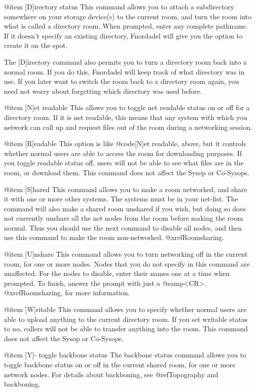 @item [D]irectory status
This command allows you to attach a subdirectory
somewhere on your storage device(s) to the current room, and
turn the room into what is called a directory room.  When
prompted, enter any complete pathname.  If it doesn't specify
an existing directory, Fnordadel will give you the option
to create it on the spot.

The [D]irectory command also permits you to turn a
directory room back into a normal room.  If you do this,
Fnordadel will keep track of what directory was in use.
If you later want to switch the room back to a directory room
again, you need not worry about forgetting which directory
was used before.

@item [N]et readable
This allows you to toggle net readable status
on or off for a directory room.  If it is net readable, this	
means that any system with which you network can call up and
request files out of the room during a networking session.

@item [R]eadable
This option is like @code{[N]et readable}, above,
but it controls whether normal users are able to access the
room for downloading purposes.  If you toggle readable status
off, users will not be able to see what files are in the room,
or download them.  This command does not affect the Sysop or Co-Sysops.

@item [S]hared
This command allows you to make a room networked, and
share it with one or more other systems.  The systems must be
in your net-list.  The command will also make a shared room
unshared if you wish, but doing so does not currently unshare
all the net nodes from the room before making the room normal.
Thus you should use the next command to disable all nodes,
and then use this command to make the room non-networked.
@xref{Roomsharing}.

@item [U]nshare
This command allows you to turn networking off in
the current room, for one or more nodes.  Nodes that you do
not specify in this command are unaffected.  For the nodes to
disable, enter their names one at a time when prompted.  To
finish, answer the prompt with just a @samp{<CR>}.  @xref{Roomsharing},
for more information.

@item [W]ritable
This command allows you to specify whether normal
users are able to upload anything to the current directory
room.  If you set writable status to no, callers will not be
able to transfer anything into the room.  This command does
not affect the Sysop or Co-Sysops.

@item [Y]- toggle backbone status
The backbone status command allows you to toggle
backbone status on or off in the current shared room, for one
or more network nodes.  For details about backboning, see
@ref{Topography and backboning}.

